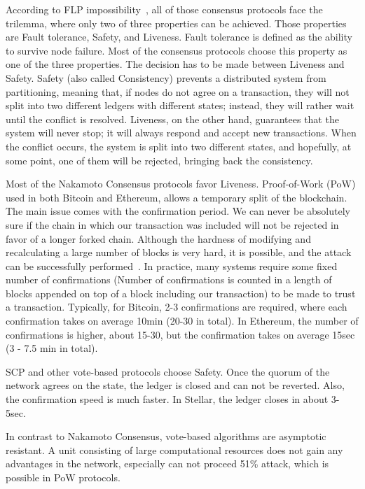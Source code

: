 \documentclass[applsci,article,submit,moreauthors,pdftex]{Definitions/mdpi}
\begin{document}
According to FLP impossibility~\cite{fischer1985impossibility}, all of those consensus protocols face the trilemma, where only two of three properties can be achieved. Those properties are Fault tolerance, Safety, and Liveness. Fault tolerance is defined as the ability to survive node failure. Most of the consensus protocols choose this property as one of the three properties. The decision has to be made between Liveness and Safety. Safety (also called Consistency) prevents a distributed system from partitioning, meaning that, if nodes do not agree on a transaction, they will not split into two different ledgers with different states; instead, they will rather wait until the conflict is resolved. Liveness, on the other hand, guarantees that the system will never stop; it will always respond and accept new transactions. When the conflict occurs, the system is split into two different states, and hopefully, at some point, one of them will be rejected, bringing back the consistency.

Most of the Nakamoto Consensus protocols favor Liveness. Proof-of-Work (PoW) used in both Bitcoin and Ethereum, allows a temporary split of the blockchain. The main issue comes with the confirmation period. We can never be absolutely sure if the chain in which our transaction was included will not be rejected in favor of a longer forked chain. 
Although the hardness of modifying and recalculating a large number of blocks is very hard, it is possible, and the attack can be successfully performed~\cite{sayeed2019assessing}.
In practice, many systems require some fixed number of confirmations (Number of confirmations is counted in a length of blocks appended on top of a block including our transaction) to be made to trust a transaction. Typically, for Bitcoin, 2-3 confirmations are required, where each confirmation takes on average 10min (20-30 in total). In Ethereum, the number of confirmations is higher, about 15-30, but the confirmation takes on average 15sec (3 - 7.5 min in total). 

SCP and other vote-based protocols choose Safety. Once the quorum of the network agrees on the state, the ledger is closed and can not be reverted. Also, the confirmation speed is much faster. In Stellar, the ledger closes in about 3-5sec. 

In contrast to Nakamoto Consensus, vote-based algorithms are asymptotic resistant. A unit consisting of large computational resources does not gain any advantages in the network, especially can not proceed 51\% attack, which is possible in PoW protocols. 
\end{document}
